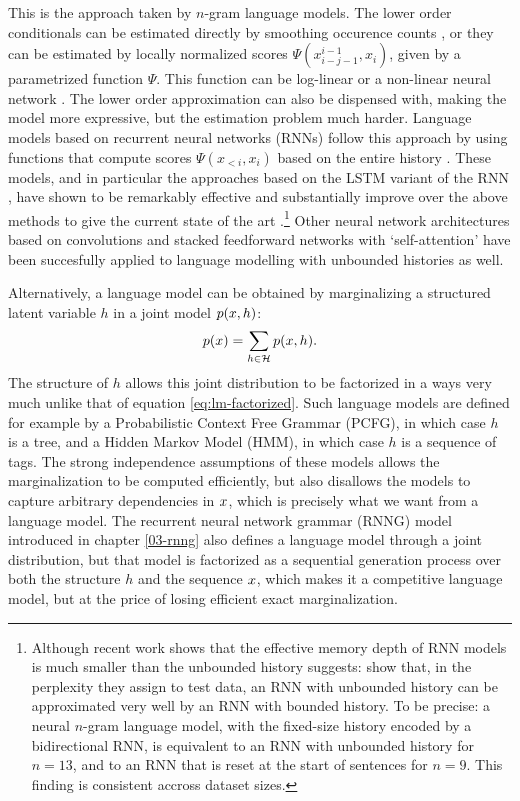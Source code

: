     This is the approach taken by $n$-gram language models. The lower order conditionals can be estimated directly by smoothing occurence counts \citep{chen1999empirical,kneser1995improved}, or they can be estimated by locally normalized scores $\Psi(x_{i-j-1}^{i-1}, x_i)$, given by a parametrized function $\Psi$. This function can be log-linear or a non-linear neural network \citep{rosenfeld1996loglinear,bengio2003neural}. The lower order approximation can also be dispensed with, making the model more expressive, but the estimation problem much harder. Language models based on recurrent neural networks (RNNs) follow this approach by using functions that compute scores $\Psi(x_{<i}, x_i)$ based on the entire history \citep{mikolov2010recurrent}. These models, and in particular the approaches based on the LSTM variant of the RNN \citep{hochreiter1997long}, have shown to be remarkably effective and substantially improve over the above methods to give the current state of the art \citep{zaremba2014recurrent,jozefowicz2016exploring,melis2017state}.\footnote{Although recent work shows that the effective memory depth of RNN models is much smaller than the unbounded history suggests: \citet{chelba2017n} show that, in the perplexity they assign to test data, an RNN with unbounded history can be approximated very well by an RNN with bounded history. To be precise: a neural $n$-gram language model, with the fixed-size history encoded by a bidirectional RNN, is equivalent to an RNN with unbounded history for $n=13$, and to an RNN that is reset at the start of sentences for $n=9$. This finding is consistent accross dataset sizes.} Other neural network architectures based on convolutions \citep{kalchbrenner2014convolutional} and stacked feedforward networks with `self-attention' \citep{vaswani2017attention} have been succesfully applied to language modelling with unbounded histories as well.

    Alternatively, a language model can be obtained by marginalizing a structured latent variable $h$ in a joint model $p(x, h)$:
    \begin{align}
      \label{eq:lm-latent}
      p( x ) = \sum_{h \in \mathcal{H}} p(x, h).
    \end{align}
    The structure of $h$ allows this joint distribution to be factorized in a ways very much unlike that of equation \ref{eq:lm-factorized}. Such language models are defined for example by a Probabilistic Context Free Grammar (PCFG), in which case $h$ is a tree, and a Hidden Markov Model (HMM), in which case $h$ is a sequence of tags. The strong independence assumptions of these models allows the marginalization to be computed efficiently, but also disallows the models to capture arbitrary dependencies in $x$, which is precisely what we want from a language model. The recurrent neural network grammar (RNNG) \citep{dyer2016rnng} model introduced in chapter \ref{03-rnng} also defines a language model through a joint distribution, but that model is factorized as a sequential generation process over both the structure $h$ and the sequence $x$, which makes it a competitive language model, but at the price of losing efficient exact marginalization.

